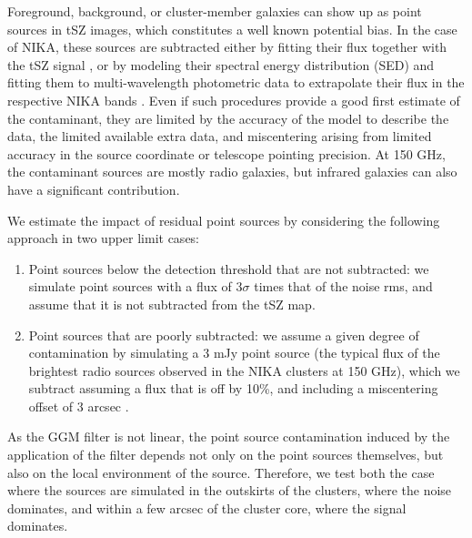 \documentclass[traditabstract]{aa}
\begin{document}
Foreground, background, or cluster-member galaxies can show up as point sources in tSZ images, which constitutes a well known potential bias. In the case of NIKA, these sources are subtracted either by fitting their flux together with the tSZ signal \citep{Adam2015}, or by modeling their spectral energy distribution (SED) and fitting them to multi-wavelength photometric data to extrapolate their flux in the respective NIKA bands \citep[see the method detailed in][]{Adam2016a}. Even if such procedures provide a good first estimate of the contaminant, they are limited by the accuracy of the model to describe the data, the limited available extra data, and miscentering arising from limited accuracy in the source coordinate or telescope pointing precision. At 150 GHz, the contaminant sources are mostly radio galaxies, but infrared galaxies can also have a significant contribution.

We estimate the impact of residual point sources by considering the following approach in two upper limit cases:
\begin{enumerate} 
\item Point sources below the detection threshold that are not subtracted: we simulate point sources with a flux of $3 \sigma$ times that of the noise rms, and assume that it is not subtracted from the tSZ map. 
\item Point sources that are poorly subtracted: we assume a given degree of contamination by simulating a 3 mJy point source (the typical flux of the brightest radio sources observed in the NIKA clusters at 150 GHz), which we subtract assuming a flux that is off by 10\%, and including a miscentering offset of 3 arcsec \citep[the NIKA pointing accuracy for one scan][]{Catalano2014}.
\end{enumerate}
As the GGM filter is not linear, the point source contamination induced by the application of the filter depends not only on the point sources themselves, but also on the local environment of the source. Therefore, we test both the case where the sources are simulated in the outskirts of the clusters, where the noise dominates, and within a few arcsec of the cluster core, where the signal dominates.
\end{document}
